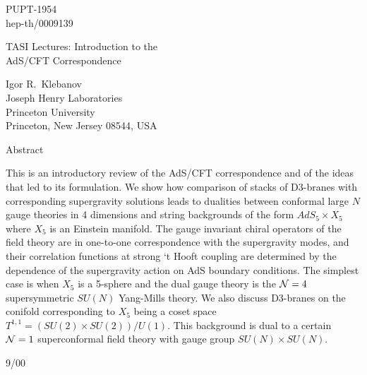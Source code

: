 \documentclass[12pt]{article}
\begin{document}
\baselineskip=15.5pt
\pagestyle{plain}
\setcounter{page}{1}

\renewcommand{\thefootnote}{\fnsymbol{footnote}}


\begin{titlepage}

\begin{flushright}
PUPT-1954\\
hep-th/0009139
\end{flushright}
\vfil

\begin{center}
{\huge TASI Lectures:
 Introduction to the \\} 
 \vspace{3 mm}
{\huge AdS/CFT Correspondence
}

\end{center}

\vfil

\begin{center}
{\large Igor R.\ Klebanov}\\
\vspace{3mm}
Joseph Henry Laboratories\\
Princeton University\\
Princeton, New Jersey 08544, USA\\
\vspace{3mm}
\end{center}

\vfil

\begin{center}
{\large Abstract}
\end{center}

\noindent
This is an introductory review of the AdS/CFT correspondence
and of the ideas that led to its formulation. We show how
comparison of stacks of D3-branes with corresponding supergravity
solutions leads
to dualities between conformal large $N$ gauge theories in
4 dimensions and string backgrounds of the form $AdS_5\times X_5$
where $X_5$ is an Einstein manifold. 
The gauge invariant chiral operators of the field theory
are in one-to-one correspondence with the supergravity modes,
and their correlation functions at strong `t Hooft coupling are
determined by the dependence of the supergravity action on AdS
boundary conditions. The simplest case
is when $X_5$ is a 5-sphere and the dual gauge theory is the
${\cal N}=4$ supersymmetric $SU(N)$ Yang-Mills theory. We also discuss
D3-branes on the conifold corresponding
to $X_5$ being a coset space $T^{1,1}=(SU(2)\times SU(2))/U(1)$.
This background is dual to a certain ${\cal N}=1$ superconformal field theory 
with gauge group $SU(N)\times SU(N)$.
\vfil
\begin{flushleft}
9/00
\end{flushleft}
\end{titlepage}
\newpage
\end{document}

